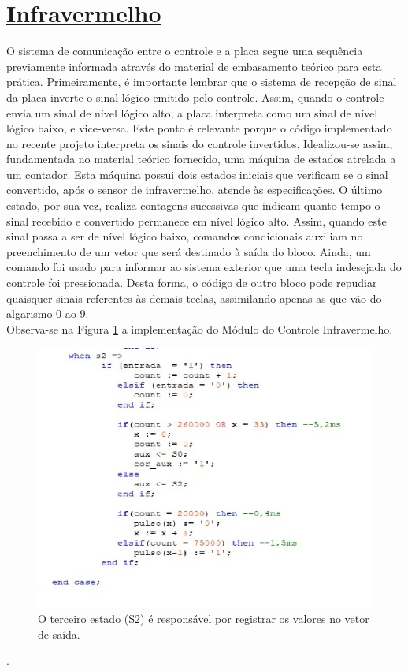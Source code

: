 \documentclass[14pt, oneside]{book}
\newcommand\tab[1][1cm]{\hspace*{#1}}
\theoremstyle{definition}
\begin{document}
            \section[Infravermelho]{\hyperlink{toc}{Infravermelho}}
                \tab  O sistema de comunicação entre o controle e a placa segue uma sequência previamente informada através do material de embasamento teórico para esta prática. Primeiramente, é importante lembrar que o sistema de recepção de sinal da placa inverte o sinal lógico emitido pelo controle. Assim, quando o controle envia um sinal de nível lógico alto, a placa interpreta como um sinal de nível lógico baixo, e vice-versa. Este ponto é relevante porque o código implementado no recente projeto interpreta os sinais do controle invertidos. Idealizou-se assim, fundamentada no material teórico fornecido, uma máquina de estados atrelada a um contador. Esta máquina possui dois estados iniciais que verificam se o sinal convertido, após o sensor de infravermelho, atende às especificações. O último estado, por sua vez, realiza contagens sucessivas que indicam quanto tempo o sinal recebido e convertido permanece em nível lógico alto. Assim, quando este sinal passa a ser de nível lógico baixo, comandos condicionais auxiliam no preenchimento de um vetor que será destinado à saída do bloco. Ainda, um comando foi usado para informar ao sistema exterior que uma tecla indesejada do controle foi pressionada. Desta forma, o código de outro bloco pode repudiar quaisquer sinais referentes às demais teclas, assimilando apenas as que vão do algarismo 0 ao 9. \\
                \tab Observa-se na Figura \ref{fig:infra} a implementação do Módulo do Controle Infravermelho.
                \begin{figure}[H]
                    \centering
                    \includegraphics[scale=0.8]{3estado.png}
                    \caption{O terceiro estado (S2) é responsável por registrar os valores no vetor de saída.}
                    \label{fig:infra}
                \end{figure}.\\
\end{document}
